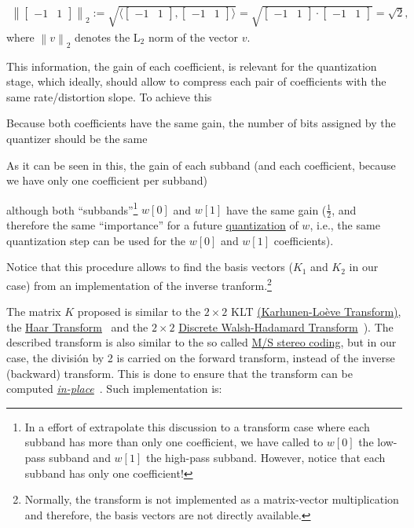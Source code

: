 \begin{equation*}
\begin{array}{l}
    \left\| \begin{bmatrix}-1 & 1\end{bmatrix} \right\|_2 := \sqrt{\langle \begin{bmatrix}-1 & 1\end{bmatrix}, \begin{bmatrix}-1 & 1\end{bmatrix} \rangle} = \sqrt{\begin{bmatrix}-1 & 1\end{bmatrix}\cdot \begin{bmatrix}-1 & 1\end{bmatrix}} = \sqrt{2},
  \end{array}
\end{equation*}
where $\left\|v \right\|_2$ denotes the L$_2$ norm of the vector $v$.

This information, the gain of each coefficient, is relevant for the
quantization stage, which ideally, should allow to compress each pair
of coefficients with the same rate/distortion slope. To achieve this

Because both coefficients have the same gain, the number of bits assigned by the quantizer should be the same

As it can be seen in this, the gain of each subband (and each coefficient, because we have only one coefficient per subband)

although both ``subbands''\footnote{In a effort of extrapolate this
discussion to a transform case where each subband has more than only
one coefficient, we have called to $w[0]$ the low-pass subband and
$w[1]$ the high-pass subband. However, notice that each subband has
only one coefficient!} $w[0]$ and $w[1]$ have the same gain
($\frac{1}{2}$, and therefore the same ``importance'' for a
future
\href{https://en.wikipedia.org/wiki/Quantization_(signal_processing)}{quantization}
of $w$, i.e., the same quantization step can be used for the $w[0]$
and $w[1]$ coefficients).

Notice that this procedure allows to find the basis vectors ($K_1$ and
$K_2$ in our case) from an implementation of the inverse
tranform.\footnote{Normally, the transform is not implemented as a
matrix-vector multiplication and therefore, the basis vectors are not
directly available.}

The matrix $K$ proposed is similar to the $2\times 2$ KLT
\href{http://fourier.eng.hmc.edu/e161/lectures/klt/node3.html}{(Karhunen-Lo\`eve
  Transform)}, the
\href{http://wavelets.pybytes.com/wavelet/haar/}{Haar
  Transform}~\cite{vetterli1995wavelets} and the $2\times 2$
\href{https://en.wikipedia.org/wiki/Hadamard_transform}{Discrete
  Walsh-Hadamard Transform}~\cite{sayood2017introduction}).  The
described transform is also similar to the so called
\href{https://en.wikipedia.org/wiki/Joint_encoding#M/S_stereo_coding}{M/S
  stereo coding}, but in our case, the división by 2 is carried on the
forward transform, instead of the inverse (backward) transform. This
is done to ensure that the transform can be computed
\href{https://en.wikipedia.org/wiki/In-place_algorithm}{\emph{in-place}}~\cite{2006.sweldens}. Such
implementation is:

